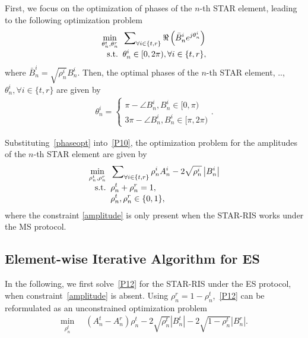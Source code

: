\documentclass[12pt, draftclsnofoot, onecolumn]{IEEEtran}
\newcommand{\ie}{\text{i}.\text{e}.}
\begin{document}
First, we focus on the optimization of phases of the $n$-th STAR element, leading to the following optimization problem 
\begin{subequations}\label{P11}
\begin{align}
\mathop {\min }\limits_{ {{\theta_n^t},{\theta_n^r}} } \;\;&\sum\nolimits_{\forall i \in \{t,r\}}\Re\left(\bar{B}_n^ie^{j\theta_n^i}\right)\\[-0.1cm]
{\rm{s.t.}}\;\;& \theta_n^i \in [0,2\pi), \forall i \in \{t,r\},
\end{align}
\end{subequations}
where $\bar{B}_n^i=\sqrt{\rho_n^i}B_n^i$. Then, the optimal phases of the $n$-th STAR element, \ie, $\theta_n^i, \forall i \in \{t,r\}$ are given by 
\begin{equation}\label{phaseopt}
\begin{aligned}
\theta_n^i = \left\{ {\begin{array}{*{20}{l}}
{\pi  - \angle B_n^i, B_n^i \in[0,\pi)}\\[-0.2cm]
{3\pi  - \angle B_n^i, B_n^i \in[\pi,2\pi)}
\end{array}} \right..
\end{aligned}
\end{equation}

Substituting~\eqref{phaseopt} into~\eqref{P10}, the optimization problem for the amplitudes of the $n$-th STAR element are given by 
\begin{subequations}\label{P12}
\begin{align}
\mathop {\min }\limits_{ {{\rho_n^t},{\rho_n^r}} } \;\;&\sum\nolimits_{ \forall i \in \{t,r\}}\rho_n^iA_n^i - 2\sqrt{\rho_n^i}\left|B_n^i\right|\\[-0.1cm]
{\rm{s.t.}}\;\;& \rho_n^t+\rho_n^r=1,\\[-0.1cm]
\label{amplitude}&\rho_n^t,\rho_n^r\in \{0, 1\}, 
\end{align}
\end{subequations}
where the constraint \eqref{amplitude} is only present when the STAR-RIS works under the MS protocol.
\subsection{Element-wise Iterative Algorithm for ES}
In the following, we first solve~\eqref{P12} for the STAR-RIS under the ES protocol, when constraint~\eqref{amplitude} is absent. Using $\rho_n^r=1-\rho_n^t$,~\eqref{P12} can be reformulated as an unconstrained optimization problem 
\begin{subequations}\label{P13}
\begin{align}
\mathop {\min }_{ {\rho_n^t} } \;\;&\left(A_n^t-A_n^r\right)\rho_n^t-2\sqrt{\rho_n^t}\left|B_n^t\right|-2\sqrt{1-\rho_n^t}\left|B_n^r\right|.
\end{align}
\end{subequations}
\end{document}
